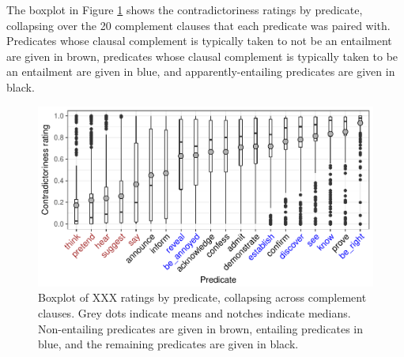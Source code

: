 \documentclass[11pt,fleqn]{article}
\newcommand{\6}{\mbox{$[\hspace*{-.6mm}[$}}
\newcommand{\9}{\mbox{$]\hspace*{-.6mm}]$}}
\begin{document}
The boxplot in Figure \ref{f-veridicality-predicate2} shows the contradictoriness ratings by predicate, collapsing over the 20 complement clauses that each predicate was paired with. Predicates whose clausal complement is typically taken to not be an entailment are given in brown, predicates whose clausal complement is typically taken to be an entailment are given in blue, and apparently-entailing predicates are given in black. 

\begin{figure}[h!]
\centering

\includegraphics[width=.8\paperwidth]{../results/2-veridicality2/graphs/boxplot-veridicality}

\caption{Boxplot of XXX ratings by predicate, collapsing across complement clauses. Grey dots indicate means and notches indicate medians. Non-entailing predicates are given in brown, entailing predicates in blue, and the remaining predicates are given in black.}
\label{f-veridicality-predicate2}
\end{figure}
\end{document}
